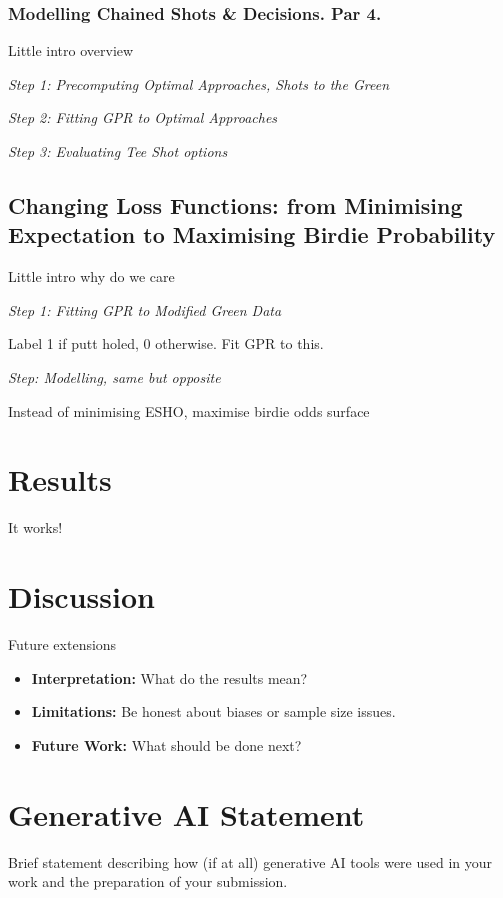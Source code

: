 \documentclass[11pt, letterpaper]{article}
\begin{document}
\subsubsection{Modelling Chained Shots \& Decisions. Par 4.}
Little intro overview

\emph{Step 1: Precomputing Optimal Approaches, Shots to the Green}

\emph{Step 2: Fitting GPR to Optimal Approaches}

\emph{Step 3: Evaluating Tee Shot options}

\subsection{Changing Loss Functions: from Minimising Expectation to Maximising Birdie Probability}
Little intro why do we care



\emph{Step 1: Fitting GPR to Modified Green Data}

Label 1 if putt holed, 0 otherwise. Fit GPR to this.

\emph{Step: Modelling, same but opposite}

Instead of minimising ESHO, maximise birdie odds surface

\section{Results}

It works!


\section{Discussion}
Future extensions

\begin{itemize}
    \item \textbf{Interpretation:} What do the results mean?
    \item \textbf{Limitations:} Be honest about biases or sample size issues.
    \item \textbf{Future Work:} What should be done next?
\end{itemize}

\newpage 
\printbibliography[title={References}]

\vspace{2cm}

\section*{Generative AI Statement}
\noindent
Brief statement describing how (if at all) generative AI tools were used in your work and the preparation of your submission.
\end{document}
